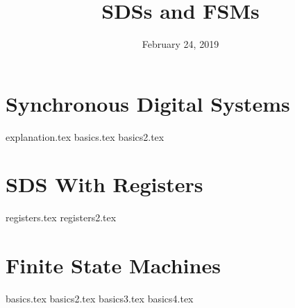 \documentclass[11pt]{exam}
\title{SDSs and FSMs}
\date{February 24, 2019}
\begin{document}
\maketitle

\section{Synchronous Digital Systems}
\begin{questions}
{explanation.tex}
{basics.tex}
{basics2.tex}
\end{questions}
\newpage

\section{SDS With Registers}
\begin{questions}
{registers.tex}
{registers2.tex}
\end{questions}
\newpage

\section{Finite State Machines}
\begin{questions}
{basics.tex}
{basics2.tex}
{basics3.tex}
{basics4.tex}
\end{questions}
\newpage
\end{document}
